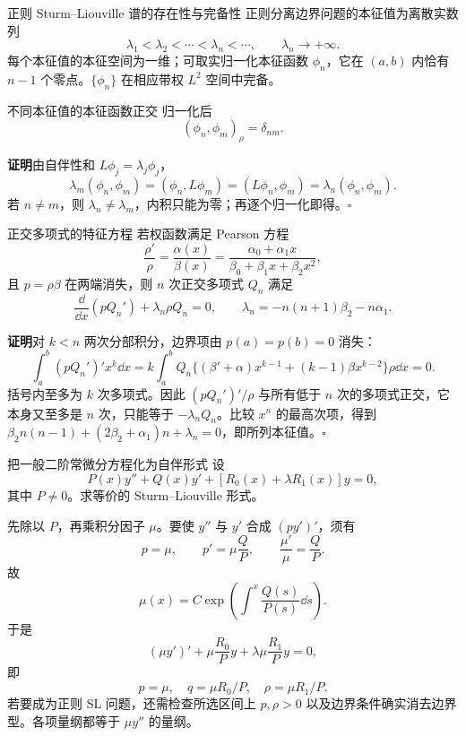 \begin{advtheorem}{正则 Sturm--Liouville 谱的存在性与完备性}\label{advA3:thm:sl-spectrum}
正则分离边界问题的本征值为离散实数列
\[
 \lambda_1<\lambda_2<\cdots<\lambda_n<\cdots,\qquad \lambda_n\to+\infty.
\]
每个本征值的本征空间为一维；可取实归一化本征函数 $\phi_n$，它在 $(a,b)$ 内恰有 $n-1$ 个零点。$\{\phi_n\}$ 在相应带权 $L^2$ 空间中完备。
\end{advtheorem}


\begin{advtheorem}{不同本征值的本征函数正交}\label{advA3:thm:sl-orthogonality}
归一化后
\[
 (\phi_n,\phi_m)_\rho=\delta_{nm}.
\]
\end{advtheorem}
\noindent\textbf{证明}\quad 由自伴性和 $L\phi_j=\lambda_j\phi_j$，
\[
 \lambda_m(\phi_n,\phi_m)=(\phi_n,L\phi_m)
 =(L\phi_n,\phi_m)=\lambda_n(\phi_n,\phi_m).
\]
若 $n\ne m$，则 $\lambda_n\ne\lambda_m$，内积只能为零；再逐个归一化即得。\hfill$\square$

\begin{advtheorem}{正交多项式的特征方程}\label{advA3:thm:orthogonal-polynomial-ode}
若权函数满足 Pearson 方程
\[
 \frac{\rho'}\rho=\frac{\alpha(x)}{\beta(x)}
 =\frac{\alpha_0+\alpha_1x}{\beta_0+\beta_1x+\beta_2x^2},
\]
且 $p=\rho\beta$ 在两端消失，则 $n$ 次正交多项式 $Q_n$ 满足
\[
 \frac{\dd}{\dd x}\left(pQ_n'\right)+\lambda_n\rho Q_n=0,
 \qquad \boxed{\lambda_n=-n(n+1)\beta_2-n\alpha_1}.
\]
\end{advtheorem}
\noindent\textbf{证明}\quad 对 $k<n$ 两次分部积分，边界项由 $p(a)=p(b)=0$ 消失：
\[
 \int_a^b (pQ_n')'x^k\dd x
 =k\int_a^bQ_n\{(\beta'+\alpha)x^{k-1}+(k-1)\beta x^{k-2}\}\rho\dd x=0.
\]
括号内至多为 $k$ 次多项式。因此 $(pQ_n')'/\rho$ 与所有低于 $n$ 次的多项式正交，它本身又至多是 $n$ 次，只能等于 $-\lambda_nQ_n$。比较 $x^n$ 的最高次项，得到
$\beta_2n(n-1)+(2\beta_2+\alpha_1)n+\lambda_n=0$，即所列本征值。\hfill$\square$

\begin{advexamplebox}{把一般二阶常微分方程化为自伴形式}\label{advA3:ex:ode-to-sl}
设
\[
 P(x)y''+Q(x)y'+[R_0(x)+\lambda R_1(x)]y=0,
 \]
其中 $P\ne0$。求等价的 Sturm--Liouville 形式。

\AQSelfAdjoint
\end{advexamplebox}
\begin{advsolution}
\AASelfAdjoint

先除以 $P$，再乘积分因子 $\mu$。要使 $y''$ 与 $y'$ 合成 $(py')'$，须有
\[
 p=\mu,\qquad p'=\mu\frac QP,\qquad
 \frac{\mu'}\mu=\frac QP.
\]
故
\[
 \mu(x)=C\exp\!\left(\int^x\frac{Q(s)}{P(s)}\dd s\right).
\]
于是
\[
 (\mu y')'+\mu\frac{R_0}{P}y+\lambda\mu\frac{R_1}{P}y=0,
\]
即
\[
 \boxed{p=\mu,\quad q=\mu R_0/P,\quad \rho=\mu R_1/P}.
\]
若要成为正则 SL 问题，还需检查所选区间上 $p,\rho>0$ 以及边界条件确实消去边界型。各项量纲都等于 $\mu y''$ 的量纲。
\end{advsolution}

